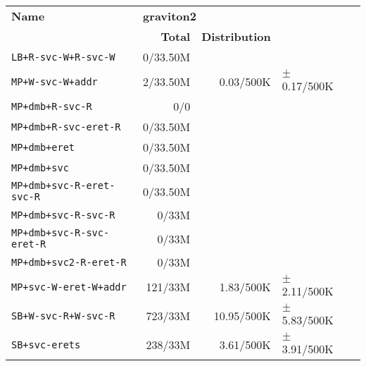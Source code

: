 \begin{tabular}{l  | r r l l}
   \textbf{Name}                  & \multicolumn{3}{l}{\textbf{graviton2}}                       & \\
                                  & \textbf{Total} & \textbf{Distribution} &                 & \\
        \verb|LB+R-svc-W+R-svc-W| &       0/33.50M &                       &                 & \\ \hline 
           \verb|MP+W-svc-W+addr| &       2/33.50M &             0.03/500K & $\pm$ 0.17/500K & \\ \hline 
            \verb|MP+dmb+R-svc-R| &            0/0 &                       &                 & \\ \hline 
       \verb|MP+dmb+R-svc-eret-R| &       0/33.50M &                       &                 & \\ \hline 
               \verb|MP+dmb+eret| &       0/33.50M &                       &                 & \\ \hline 
                \verb|MP+dmb+svc| &       0/33.50M &                       &                 & \\ \hline 
   \verb|MP+dmb+svc-R-eret-svc-R| &       0/33.50M &                       &                 & \\ \hline 
        \verb|MP+dmb+svc-R-svc-R| &          0/33M &                       &                 & \\ \hline 
   \verb|MP+dmb+svc-R-svc-eret-R| &          0/33M &                       &                 & \\ \hline 
      \verb|MP+dmb+svc2-R-eret-R| &          0/33M &                       &                 & \\ \hline 
      \verb|MP+svc-W-eret-W+addr| &        121/33M &             1.83/500K & $\pm$ 2.11/500K & \\ \hline 
        \verb|SB+W-svc-R+W-svc-R| &        723/33M &            10.95/500K & $\pm$ 5.83/500K & \\ \hline 
              \verb|SB+svc-erets| &        238/33M &             3.61/500K & $\pm$ 3.91/500K & \\ \hline 
\end{tabular}
